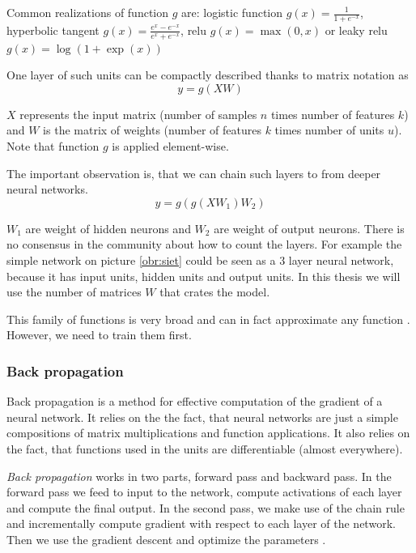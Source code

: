         Common realizations of function $g$ are: logistic function $g(x) = \frac{1}{1+e^{-x}}$, 
        hyperbolic tangent $g(x)=\frac{e^x-e^{-x}}{e^x+e^{-x}}$, relu $g(x) = \max(0,x)$ or leaky relu $g(x)=\log(1+\exp(x))$
        
        One layer of such units can be compactly described thanks to matrix notation as
        $$y=g(X W)$$
        
        $X$ represents the input matrix (number of samples $n$ times number of features $k$) and $W$ is the matrix of weights (number of features $k$ times number of units $u$). Note that function $g$ is applied element-wise.
        
        The important observation is, that we can chain such layers to from deeper neural networks.
        $$y=g(g(X W_1) W_2)$$
        
        $W_1$ are weight of hidden neurons and $W_2$ are weight of output neurons.
        There is no consensus in the community about how to count the layers. 
        For example the simple network on picture \ref{obr:siet} could be seen as a $3$ layer neural network,
        because it has input units, hidden units and output units.
        In this thesis we will use the number of matrices $W$ that crates the model.
        
        This family of functions is very broad and can in fact approximate any function \cite{cybenko1989approximation}.
        However, we need to train them first.
        
        \subsubsection{Back propagation}
        
        Back propagation is a method for effective computation of the gradient of a neural network.
        It relies on the the fact, that neural networks are just a simple compositions of matrix multiplications 
        and function applications. 
        It also relies on the fact, that functions used in the units are differentiable (almost everywhere).
        
        \textit{Back propagation} works in two parts, forward pass and backward pass.
        In the forward pass we feed to input to the network, compute activations of each layer and compute the final output.
        In the second pass, we make use of the chain rule and incrementally compute gradient with respect to each layer of the network.
        Then we use the gradient descent and optimize the parameters \cite{rumelhart1986david}.
        
